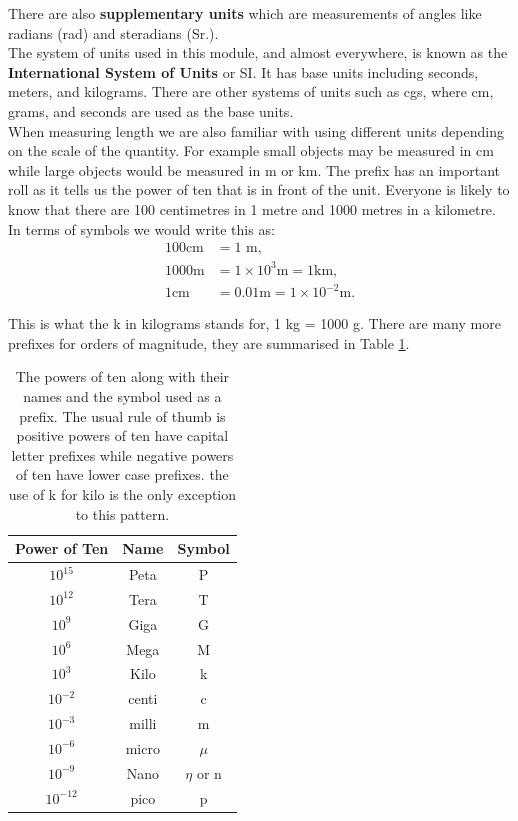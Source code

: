 There are also \textbf{supplementary units} which are measurements of angles like radians (rad) and steradians (Sr.).\\

The system of units used in this module, and almost everywhere, is known as the \textbf{International System of Units} or SI. It has base units including seconds, meters, and kilograms. There are other systems of units such as cgs, where cm, grams, and seconds are used as the base units.\\

When measuring length we are also familiar with using different units depending on the scale of the quantity. For example small objects may be measured in cm while large objects would be measured in m or km. The prefix has an important roll as it tells us the power of ten that is in front of the unit. Everyone is likely to know that there are 100 centimetres in 1 metre and 1000 metres in a kilometre. In terms of symbols we would write this as:
\begin{align*}
    100 \text{cm} &=1 \text{ m},\\
    1000 \text{m} &= 1\times 10^{3} \text{m} = 1 \text{km},\\
    1 \text{cm} &= 0.01 \text{m} = 1\times 10^{-2} \text{m}.
\end{align*}

This is what the k in kilograms stands for, 1 kg = 1000 g. There are many more prefixes for orders of magnitude, they are summarised in Table \cref{table:1}.

\begin{table}[ht]
\centering
\caption{The powers of ten along with their names and the symbol used as a prefix. The usual rule of thumb is positive powers of ten have capital letter prefixes while negative powers of ten have lower case prefixes. the use of k for kilo is the only exception to this pattern.}

\vspace{4mm}

\label{table:1}



\begin{tabular}{|c|c|c|} 
 \hline
 \textbf{Power of Ten} & \textbf{Name} & \textbf{Symbol}\\
 \hline
 $10^{15}$ & Peta & P \\
 \hline
$10^{12}$ &	Tera & T \\
\hline
$10^{9}$ &	Giga & G	\\
\hline
$10^{6}$ &	Mega & M	\\
\hline
$10^{3}$ &	Kilo & k	\\
\hline
$10^{-2}$ &	centi & c	\\
\hline
$10^{-3}$ &	milli & m \\
\hline
$10^{-6}$ &	micro & $\mu$	\\
\hline
$10^{-9}$ &	Nano & $\eta$ or n	\\
\hline
$10^{-12}$ &pico & p\\
\hline
\end{tabular}
\end{table}

